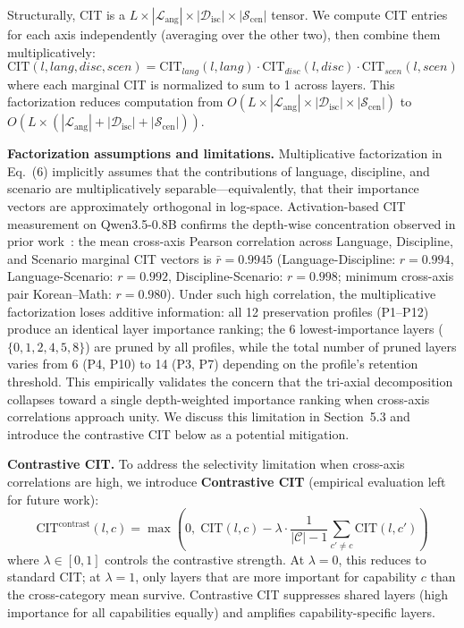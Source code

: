 \documentclass[twocolumn]{article}
\begin{document}
Structurally, CIT is a $L \times |\mathcal{L}_{\text{ang}}| \times |\mathcal{D}_{\text{isc}}| \times |\mathcal{S}_{\text{cen}}|$ tensor.
We compute CIT entries for each axis independently (averaging over the other two), then combine them multiplicatively:
\begin{equation}
\text{CIT}(l, lang, disc, scen) = \text{CIT}_{lang}(l, lang) \cdot \text{CIT}_{disc}(l, disc) \cdot \text{CIT}_{scen}(l, scen)
\end{equation}
where each marginal CIT is normalized to sum to 1 across layers.
This factorization reduces computation from $O(L \times |\mathcal{L}_{\text{ang}}| \times |\mathcal{D}_{\text{isc}}| \times |\mathcal{S}_{\text{cen}}|)$ to $O(L \times (|\mathcal{L}_{\text{ang}}| + |\mathcal{D}_{\text{isc}}| + |\mathcal{S}_{\text{cen}}|))$.

\textbf{Factorization assumptions and limitations.}
Multiplicative factorization in Eq.~(6) implicitly assumes that the contributions of language, discipline, and scenario are multiplicatively separable---equivalently, that their importance vectors are approximately orthogonal in log-space.
Activation-based CIT measurement on Qwen3.5-0.8B confirms the depth-wise concentration observed in prior work~\citep{men2024shortgpt,meng2022rome}: the mean cross-axis Pearson correlation across Language, Discipline, and Scenario marginal CIT vectors is $\bar{r} = 0.9945$ (Language-Discipline: $r = 0.994$, Language-Scenario: $r = 0.992$, Discipline-Scenario: $r = 0.998$; minimum cross-axis pair Korean--Math: $r = 0.980$).
Under such high correlation, the multiplicative factorization loses additive information: all 12 preservation profiles (P1--P12) produce an identical layer importance ranking; the 6 lowest-importance layers ($\{0,1,2,4,5,8\}$) are pruned by all profiles, while the total number of pruned layers varies from 6 (P4, P10) to 14 (P3, P7) depending on the profile's retention threshold.
This empirically validates the concern that the tri-axial decomposition collapses toward a single depth-weighted importance ranking when cross-axis correlations approach unity.
We discuss this limitation in Section~5.3 and introduce the contrastive CIT below as a potential mitigation.

\textbf{Contrastive CIT.}
To address the selectivity limitation when cross-axis correlations are high, we introduce \textbf{Contrastive CIT} (empirical evaluation left for future work):
\begin{equation}
\text{CIT}^{\text{contrast}}(l, c) = \max\!\left(0,\; \text{CIT}(l, c) - \lambda \cdot \frac{1}{|\mathcal{C}|-1}\sum_{c' \neq c} \text{CIT}(l, c')\right)
\end{equation}
where $\lambda \in [0, 1]$ controls the contrastive strength.
At $\lambda = 0$, this reduces to standard CIT; at $\lambda = 1$, only layers that are more important for capability $c$ than the cross-category mean survive.
Contrastive CIT suppresses shared layers (high importance for all capabilities equally) and amplifies capability-specific layers.
\end{document}
